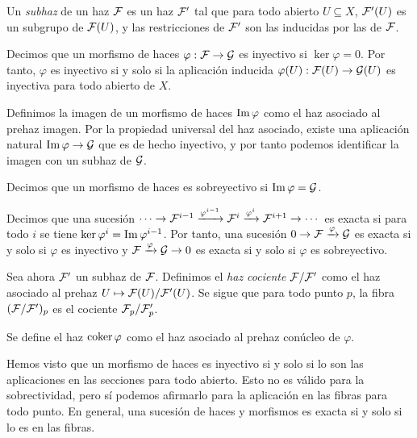\documentclass[GA.tex]{subfiles}
\begin{document}
\begin{defi}
Un \emph{subhaz} de un haz $\mathcal{F}$ es un haz $\mathcal{F}'$ tal que para todo abierto $U\subseteq X$, $\mathcal{F}'(U)$ es un subgrupo de $\mathcal{F}(U)$, y las restricciones de $\mathcal{F}'$ son las inducidas por las de $\mathcal{F}$. 

Decimos que un morfismo de haces $\varphi:\mathcal{F}\to\mathcal{G}$ es inyectivo si $\ker\varphi=0$. Por tanto, $\varphi$ es inyectivo si y solo si la aplicación inducida $\varphi(U):\mathcal{F}(U)\to\mathcal{G}(U)$ es inyectiva para todo abierto de $X$.

Definimos la imagen de un morfismo de haces $\operatorname{Im}\varphi$ como el haz asociado al prehaz imagen. Por la propiedad universal del haz asociado, existe una aplicación natural $\operatorname{Im}\varphi\to\mathcal{G}$ que es de hecho inyectivo, y por tanto podemos identificar la imagen con un subhaz de $\mathcal{G}$. 

Decimos que un morfismo de haces es sobreyectivo si $\operatorname{Im}\varphi=\mathcal{G}$.

Decimos que una sucesión $\cdots\to\mathcal{F}^{i-1}\xrightarrow{\varphi^{i-1}}\mathcal{F}^i\xrightarrow{\varphi^i}\mathcal{F}^{i+1}\to\cdots$ es exacta si para todo $i$ se tiene $\ker\varphi^i=\operatorname{Im}\varphi^{i-1}$. Por tanto, una sucesión $0\to\mathcal{F}\xrightarrow{\varphi}\mathcal{G}$ es exacta si y solo si $\varphi$ es inyectivo y $\mathcal{F}\xrightarrow{\varphi}\mathcal{G}\to 0$ es exacta si y solo si $\varphi$ es sobreyectivo. 

Sea ahora $\mathcal{F}'$ un subhaz de $\mathcal{F}$. Definimos el \emph{haz cociente} $\mathcal{F}/\mathcal{F}'$ como el haz asociado al prehaz $U\mapsto \mathcal{F}(U)/\mathcal{F}'(U)$. Se sigue que para todo punto $p$, la fibra $(\mathcal{F}/\mathcal{F}')_p$ es el cociente $\mathcal{F}_p/\mathcal{F}'_p$.

Se define el haz $\operatorname{coker}\varphi$ como el haz asociado al prehaz conúcleo de $\varphi$. 
\end{defi}

\begin{nota}
Hemos visto que un morfismo de haces es inyectivo si y solo si lo son las aplicaciones en las secciones para todo abierto. Esto no es válido para la sobrectividad, pero sí podemos afirmarlo para la aplicación en las fibras para todo punto. En general, una sucesión de haces y morfismos es exacta si y solo si lo es en las fibras. 
\end{nota}
\end{document}
